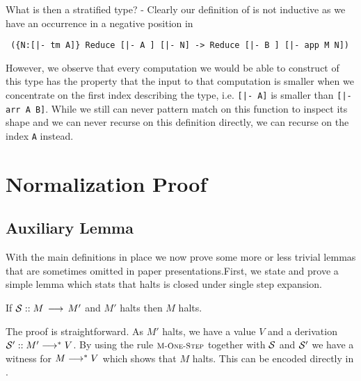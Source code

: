 What is then a stratified type? - Clearly our definition of
 is not inductive as we have an occurrence in a negative
position in 

\begin{lstlisting}
 ({N:[|- tm A]} Reduce [|- A ] [|- N] -> Reduce [|- B ] [|- app M N])  
\end{lstlisting}


However, we observe that every computation we would be able to
construct of this type has the property that the input to that
computation is smaller when we concentrate on the first index
describing the type, i.e. \lstinline![|- A]! is smaller than
\lstinline![|- arr A B]!. While we still can never
pattern match on this function to inspect its shape and we can never
recurse on this definition directly, we can recurse on the index
\lstinline!A! instead. 




\section{Normalization Proof}
\subsection{Auxiliary Lemma}
With the main definitions in place we now prove some more or less trivial lemmas that are
sometimes omitted in paper presentations.First, we state and prove a
simple lemma which stats that halts is closed under single step expansion.

\begin{lemma}[]
If $\proofderiv{\S}{M \Steps M'}$ and $M'$ halts then $M$ halts.
\end{lemma}

The proof is straightforward. As $M'$ halts, we have a value $V$ and a
derivation $\proofderiv{\S'}{M' \MSteps V}$. By using the rule $\MOne$ together with
$\S$ and $\S'$ we have a witness for $M \MSteps V$ which shows that $M$ halts.
This can be encoded directly in \beluga.

